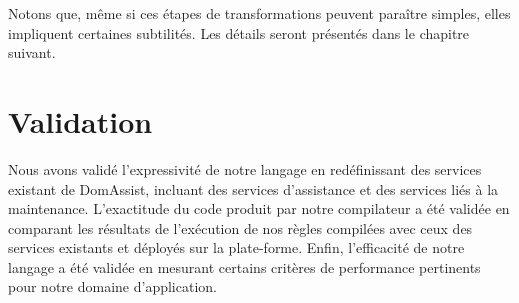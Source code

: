 
Notons que, même si ces étapes de transformations peuvent paraître simples, 
elles impliquent certaines subtilités. Les détails seront présentés dans le chapitre suivant.

\section{Validation}\label{sec:validation}
Nous avons validé l'expressivité de notre langage en redéfinissant des
services existant de DomAssist, incluant des services d'assistance et des services liés à la maintenance. 
L'exactitude du code produit par
notre compilateur a été validée en comparant les résultats de
l'exécution de nos règles compilées avec ceux des services existants
et déployés sur la plate-forme. Enfin, l'efficacité de notre langage a
été validée en mesurant certains critères de performance pertinents
pour notre domaine d'application.

